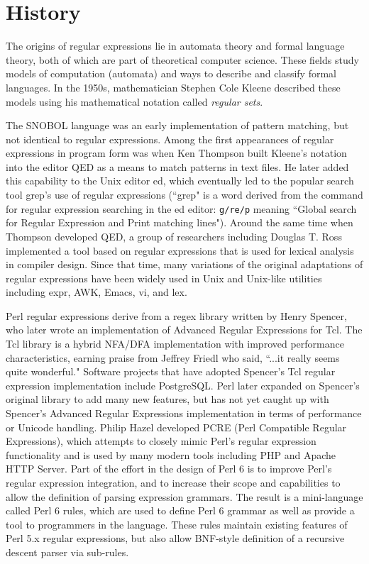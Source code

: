 \chapter{History}


The origins of regular expressions lie in automata theory and formal language theory, both of which are part of theoretical computer science. These fields study models of computation (automata) and ways to describe and classify formal languages. In the 1950s, mathematician Stephen Cole Kleene described these models using his mathematical notation called \textsl{regular sets}. 

The SNOBOL language was an early implementation of pattern matching, but not identical to regular expressions. Among the first appearances of regular expressions in program form was when Ken Thompson built Kleene's notation into the editor QED as a means to match patterns in text files. He later added this capability to the Unix editor ed, which eventually led to the popular search tool grep's use of regular expressions (``grep" is a word derived from the command for regular expression searching in the ed editor: \texttt{g/re/p} meaning ``Global search for Regular Expression and Print matching lines"). Around the same time when Thompson developed QED, a group of researchers including Douglas T. Ross implemented a tool based on regular expressions that is used for lexical analysis in compiler design. Since that time, many variations of the original adaptations of regular expressions have been widely used in Unix and Unix-like utilities including expr, AWK, Emacs, vi, and lex.

Perl regular expressions derive from a regex library written by Henry Spencer, who later wrote an implementation of Advanced Regular Expressions for Tcl. The Tcl library is a hybrid NFA/DFA implementation with improved performance characteristics, earning praise from Jeffrey Friedl who said, ``...it really seems quite wonderful." Software projects that have adopted Spencer's Tcl regular expression implementation include PostgreSQL. Perl later expanded on Spencer's original library to add many new features, but has not yet caught up with Spencer's Advanced Regular Expressions implementation in terms of performance or Unicode handling. Philip Hazel developed PCRE (Perl Compatible Regular Expressions), which attempts to closely mimic Perl's regular expression functionality and is used by many modern tools including PHP and Apache HTTP Server. Part of the effort in the design of Perl 6 is to improve Perl's regular expression integration, and to increase their scope and capabilities to allow the definition of parsing expression grammars. The result is a mini-language called Perl 6 rules, which are used to define Perl 6 grammar as well as provide a tool to programmers in the language. These rules maintain existing features of Perl 5.x regular expressions, but also allow BNF-style definition of a recursive descent parser via sub-rules.

